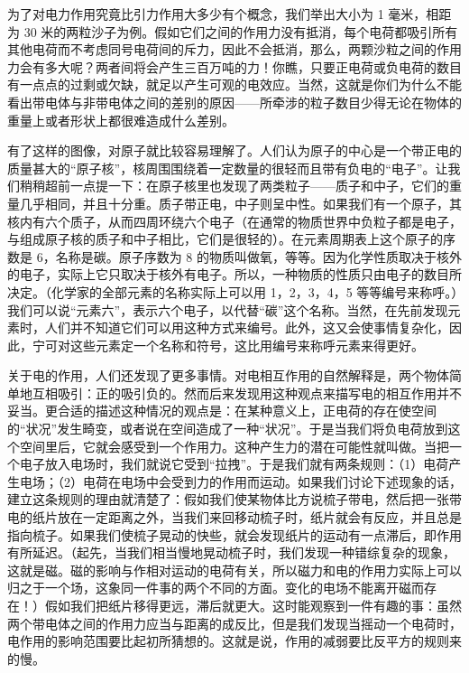 \documentclass[11pt,oneside]{book}
\begin{document}
\begin{common-format}
为了对电力作用究竟比引力作用大多少有个概念，我们举出大小为 1 毫米，相距为 30 米的两粒沙子为例。假如它们之间的作用力没有抵消，每个电荷都吸引所有其他电荷而不考虑同号电荷间的斥力，因此不会抵消，那么，两颗沙粒之间的作用力会有多大呢？两者间将会产生三百万吨的力！你瞧，只要正电荷或负电荷的数目有一点点的过剩或欠缺，就足以产生可观的电效应。当然，这就是你们为什么不能看出带电体与非带电体之间的差别的原因——所牵涉的粒子数目少得无论在物体的重量上或者形状上都很难造成什么差别。

有了这样的图像，对原子就比较容易理解了。人们认为原子的中心是一个带正电的质量甚大的“原子核”，核周围围绕着一定数量的很轻而且带有负电的“电子”。让我们稍稍超前一点提一下：在原子核里也发现了两类粒子——质子和中子，它们的重量几乎相同，并且十分重。质子带正电，中子则呈中性。如果我们有一个原子，其核内有六个质子，从而四周环绕六个电子（在通常的物质世界中负粒子都是电子，与组成原子核的质子和中子相比，它们是很轻的）。在元素周期表上这个原子的序数是 6，名称是碳。原子序数为 8 的物质叫做氧，等等。因为化学性质取决于核外的电子，实际上它只取决于核外有电子。所以，一种物质的性质只由电子的数目所决定。（化学家的全部元素的名称实际上可以用 1，2，3，4，5 等等编号来称呼。）我们可以说“元素六”，表示六个电子，以代替“碳”这个名称。当然，在先前发现元素时，人们并不知道它们可以用这种方式来编号。此外，这又会使事情复杂化，因此，宁可对这些元素定一个名称和符号，这比用编号来称呼元素来得更好。

关于电的作用，人们还发现了更多事情。对电相互作用的自然解释是，两个物体简单地互相吸引：正的吸引负的。然而后来发现用这种观点来描写电的相互作用并不妥当。更合适的描述这种情况的观点是：在某种意义上，正电荷的存在使空间的“状况”发生畸变，或者说在空间造成了一种“状况”。于是当我们将负电荷放到这个空间里后，它就会感受到一个作用力。这种产生力的潜在可能性就叫做。当把一个电子放入电场时，我们就说它受到“拉拽”。于是我们就有两条规则：（1）电荷产生电场；（2）电荷在电场中会受到力的作用而运动。如果我们讨论下述现象的话，建立这条规则的理由就清楚了：假如我们使某物体比方说梳子带电，然后把一张带电的纸片放在一定距离之外，当我们来回移动梳子时，纸片就会有反应，并且总是指向梳子。如果我们使梳子晃动的快些，就会发现纸片的运动有一点滞后，即作用有所延迟。（起先，当我们相当慢地晃动梳子时，我们发现一种错综复杂的现象，这就是磁。磁的影响与作相对运动的电荷有关，所以磁力和电的作用力实际上可以归之于一个场，这象同一件事的两个不同的方面。变化的电场不能离开磁而存在！）假如我们把纸片移得更远，滞后就更大。这时能观察到一件有趣的事：虽然两个带电体之间的作用力应当与距离的成反比，但是我们发现当摇动一个电荷时，电作用的影响范围要比起初所猜想的。这就是说，作用的减弱要比反平方的规则来的慢。


\end{common-format}
\end{document}
